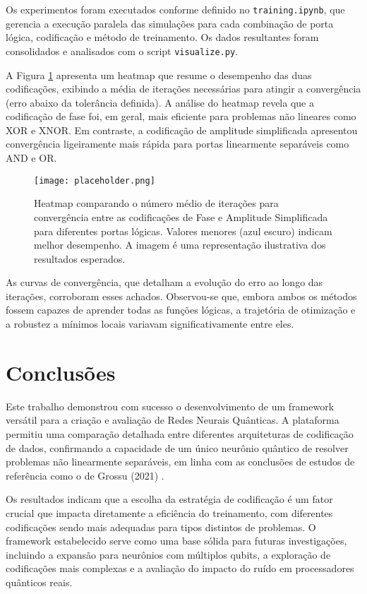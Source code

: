 \documentclass[12pt, a4paper]{article}
\begin{document}
Os experimentos foram executados conforme definido no \texttt{training.ipynb}, que gerencia a execução paralela das simulações para cada combinação de porta lógica, codificação e método de treinamento. Os dados resultantes foram consolidados e analisados com o script \texttt{visualize.py}.

A Figura \ref{fig:heatmap} apresenta um heatmap que resume o desempenho das duas codificações, exibindo a média de iterações necessárias para atingir a convergência (erro abaixo da tolerância definida). A análise do heatmap revela que a codificação de fase foi, em geral, mais eficiente para problemas não lineares como XOR e XNOR. Em contraste, a codificação de amplitude simplificada apresentou convergência ligeiramente mais rápida para portas linearmente separáveis como AND e OR.

\begin{figure}[h!]
    \centering
    \texttt{[image: placeholder.png]}
    \caption{Heatmap comparando o número médio de iterações para convergência entre as codificações de Fase e Amplitude Simplificada para diferentes portas lógicas. Valores menores (azul escuro) indicam melhor desempenho. A imagem é uma representação ilustrativa dos resultados esperados.}
    \label{fig:heatmap}
\end{figure}

As curvas de convergência, que detalham a evolução do erro ao longo das iterações, corroboram esses achados. Observou-se que, embora ambos os métodos fossem capazes de aprender todas as funções lógicas, a trajetória de otimização e a robustez a mínimos locais variavam significativamente entre eles.

\section*{Conclusões}

Este trabalho demonstrou com sucesso o desenvolvimento de um framework versátil para a criação e avaliação de Redes Neurais Quânticas. A plataforma permitiu uma comparação detalhada entre diferentes arquiteturas de codificação de dados, confirmando a capacidade de um único neurônio quântico de resolver problemas não linearmente separáveis, em linha com as conclusões de estudos de referência como o de Grossu (2021) \cite{grossu2021}.

Os resultados indicam que a escolha da estratégia de codificação é um fator crucial que impacta diretamente a eficiência do treinamento, com diferentes codificações sendo mais adequadas para tipos distintos de problemas. O framework estabelecido serve como uma base sólida para futuras investigações, incluindo a expansão para neurônios com múltiplos qubits, a exploração de codificações mais complexas e a avaliação do impacto do ruído em processadores quânticos reais.
\end{document}
